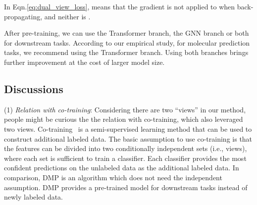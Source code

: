 \documentclass{article}
\newcommand{\ourM}{DMP}
\begin{document}
In Eqn.\eqref{eq:dual_view_loss},  means that the gradient is not applied to  when back-propagating, and neither is .

\iffalse
The overall loss function is:

where two MLM loss functions are normalized by the numbers of masked tokens in  and masked atoms in , so that their magnitudes are comparable to the dual-view loss.
\fi

After pre-training, we can use the Transformer branch, the GNN branch or both for downstream tasks. According to our empirical study, for molecular prediction tasks, we recommend using the Transformer branch. Using both branches brings further improvement at the cost of larger model size.



\iffalse
We apply the BYOL-like Prediction on the sequence representation  and graph embedding . Motivate by BYOL~\cite{BYOL2020} where they use the momentum-updated backup of encoder to boost the online encoder, we use the different view of the same molecule and the different model architecture to boost the representation of one different view and encoder. Specifically, assuming that we have gotten the sequence representation  and graph embedding , we want to maximize the cosine similarity of these two representation in representation space. Similar to prior works \cite{BYOL2020,chen2020big}, we augment each branch with a projector  or  and a predictor  or . Thus we first define the normalized cosine similarity score of vector  and  as 

where  is the cosine distance of  and . Then we define the BYOL-like Prediction loss as

where  means the stop gradient operation.
\fi

\subsection{Discussions}
(1) {\it Relation with co-training}: Considering there are two ``views'' in our method, people might be curious the the relation with co-training, which also leveraged two views. Co-training~\cite{blum1998combining} is a semi-supervised learning method that can be used to construct additional labeled data. The basic assumption to use co-training is that the features can be divided into two conditionally independent sets (i.e., views), where each set is sufficient to train a classifier. Each classifier provides the most confident predictions on the unlabeled data as the additional labeled data. 
In comparison, \ourM{} is an algorithm which does not need the independent assumption. \ourM{} provides a pre-trained model for downstream tasks instead of newly labeled data.
\end{document}
